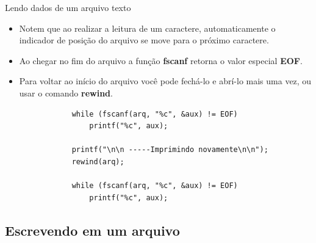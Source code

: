 \documentclass[handout]{beamer}
\begin{document}
\begin{frame}[fragile]{Lendo dados de um arquivo texto}

    \begin{itemize}
        \item Notem que ao realizar a leitura de um caractere, automaticamente
        o indicador de posição do arquivo se move para o próximo caractere.
        \item Ao chegar no fim do arquivo a função \textbf{fscanf} retorna o valor
        especial \textbf{EOF}.
        \item Para voltar ao início do arquivo você pode
        fechá-lo e abrí-lo mais uma vez, ou usar o comando \textbf{rewind}.
        \begin{verbatim}
            while (fscanf(arq, "%c", &aux) != EOF)
                printf("%c", aux);

            printf("\n\n -----Imprimindo novamente\n\n");
            rewind(arq);

            while (fscanf(arq, "%c", &aux) != EOF)
                printf("%c", aux);
      \end{verbatim}
  \end{itemize}

\end{frame}


\subsection{Escrevendo em um arquivo}
\end{document}
